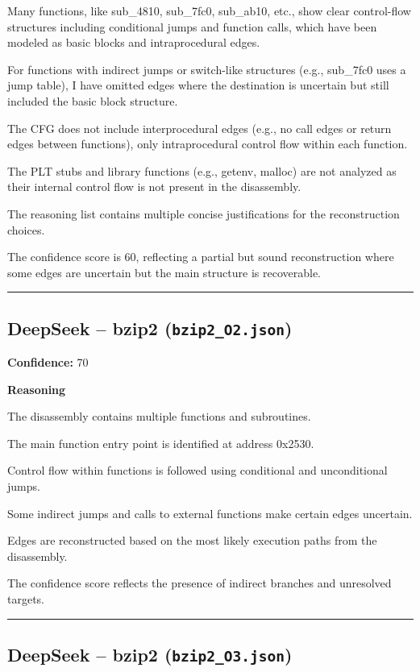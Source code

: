 Many functions, like sub\_4810, sub\_7fc0, sub\_ab10, etc., show clear control-flow structures including conditional jumps and function calls, which have been modeled as basic blocks and intraprocedural edges.

For functions with indirect jumps or switch-like structures (e.g., sub\_7fc0 uses a jump table), I have omitted edges where the destination is uncertain but still included the basic block structure.

The CFG does not include interprocedural edges (e.g., no call edges or return edges between functions), only intraprocedural control flow within each function.

The PLT stubs and library functions (e.g., getenv, malloc) are not analyzed as their internal control flow is not present in the disassembly.

The reasoning list contains multiple concise justifications for the reconstruction choices.

The confidence score is 60, reflecting a partial but sound reconstruction where some edges are uncertain but the main structure is recoverable.

\bigskip
\hrule
\bigskip

\subsection{DeepSeek -- bzip2 (\texttt{bzip2\_O2.json})}

\textbf{Confidence:} 70

\textbf{Reasoning}

The disassembly contains multiple functions and subroutines.

The main function entry point is identified at address 0x2530.

Control flow within functions is followed using conditional and unconditional jumps.

Some indirect jumps and calls to external functions make certain edges uncertain.

Edges are reconstructed based on the most likely execution paths from the disassembly.

The confidence score reflects the presence of indirect branches and unresolved targets.

\bigskip
\hrule
\bigskip

\subsection{DeepSeek -- bzip2 (\texttt{bzip2\_O3.json})}

